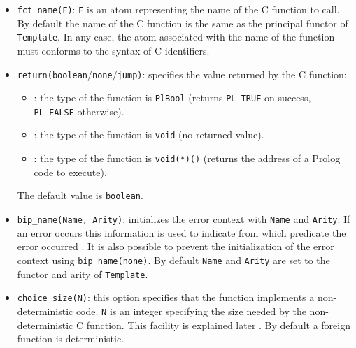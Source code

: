\begin{itemize}

\item {}\texttt{fct\_name(F)}: \texttt{F} is an atom representing
the name of the C function to call. By default the name of the C function is
the same as the principal functor of \texttt{Template}. In any case, the atom
associated with the name of the function must conforms to the syntax of C
identifiers.

\item {}\texttt{return(boolean}/\texttt{none}/\texttt{jump)}:
specifies the value returned by the C function:

\begin{itemize}

\item {}: the type of the function is \texttt{PlBool} (returns
\texttt{PL\_TRUE} on success, \texttt{PL\_FALSE} otherwise).

\item {}: the type of the function is \texttt{void} (no returned
value).

\item {}: the type of the function is \texttt{void(*)()} (returns
the address of a Prolog code to execute).

\end{itemize}

The default value is \texttt{boolean}.

\item {}\texttt{bip\_name(Name, Arity)}: initializes the error
context with \texttt{Name} and \texttt{Arity}. If an error occurs this
information is used to indicate from which predicate the error occurred
. It is also possible to prevent the
initialization of the error context using \texttt{bip\_name(none)}. By
default \texttt{Name} and \texttt{Arity} are set to the functor and arity of
\texttt{Template}.

\item {}\texttt{choice\_size(N)}: this option specifies that the
function implements a non-deterministic code. \texttt{N} is an integer
specifying the size needed by the non-deterministic C function. This facility
is explained later . By default a
foreign function is deterministic.

\end{itemize}

